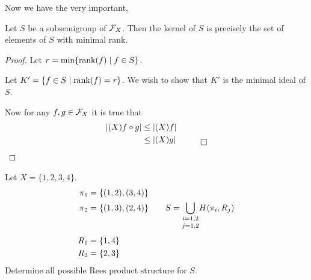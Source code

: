 Now we have the very important,

\begin{theorem} 	\label{thm:2.3}
Let $S$ be a subsemigroup of $\mathcal{F}_X$.  
Then the kernel of $S$ is precisely the set of elements of $S$ with minimal rank.
\end{theorem}

\begin{proof} Let $r = \min \{ \operatorname{rank}(f) \mid f \in S \}$.

     Let $K' = \{ f \in S \mid \operatorname{rank}(f) = r \}$.  We wish to show that
$K'$ is the minimal ideal of $S$.

     Now for any $f,g \in \mathcal{F}_X$ it is true that
\[
\begin{aligned}
       |(X) f \circ g| &\le |(X) f|                \\
       &\le |(X)g|\quad\qed
\end{aligned}
\]
\end{proof}

Let $X = \{ 1,2,3,4\}$.
\[
     \aligned
     \pi_1 &= \{ (1,2),(3,4)\}                          \\
     \pi_2 &= \{ (1,3),(2,4)\} \qquad
          S = \underset{j=1,2}{\bigcup_{i=1,2}}
          H(\pi_i,R_j)                                  \\[4pt]
     R_1 &= \{ 1,4\}                                    \\
     R_2 &= \{ 2,3\}
     \endaligned
\]
Determine all possible Rees product structure for $S$.












